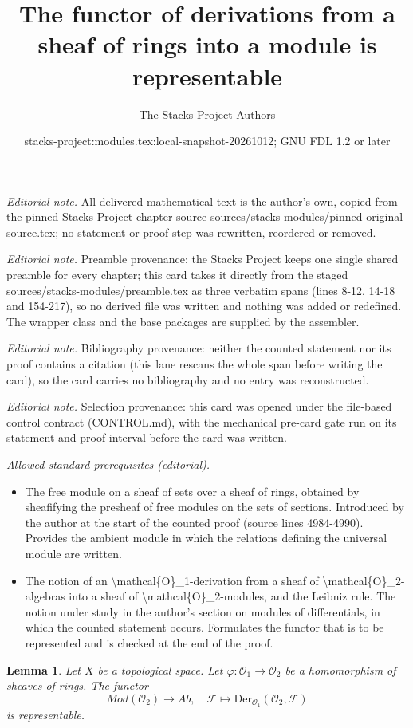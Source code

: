 \documentclass[10pt,a4paper]{amsart}
\title{The functor of derivations from a sheaf of rings into a module is representable}
\author{The Stacks Project Authors}
\date{stacks-project:modules.tex:local-snapshot-20261012; GNU FDL 1.2 or later}
\theoremstyle{plain}
\newtheorem{lemma}[subsection]{Lemma}
\theoremstyle{definition}
\theoremstyle{remark}
\numberwithin{equation}{subsection}
\begin{document}
\maketitle
\noindent\textit{Editorial note.} All delivered mathematical text is the author's own, copied from the pinned Stacks Project chapter source sources/stacks-modules/pinned-original-source.tex; no statement or proof step was rewritten, reordered or removed.\par\medskip
\noindent\textit{Editorial note.} Preamble provenance: the Stacks Project keeps one single shared preamble for every chapter; this card takes it directly from the staged sources/stacks-modules/preamble.tex as three verbatim spans (lines 8-12, 14-18 and 154-217), so no derived file was written and nothing was added or redefined. The wrapper class and the base packages are supplied by the assembler.\par\medskip
\noindent\textit{Editorial note.} Bibliography provenance: neither the counted statement nor its proof contains a citation (this lane rescans the whole span before writing the card), so the card carries no bibliography and no entry was reconstructed.\par\medskip
\noindent\textit{Editorial note.} Selection provenance: this card was opened under the file-based control contract (CONTROL.md), with the mechanical pre-card gate run on its statement and proof interval before the card was written.\par\medskip
\noindent\textit{Allowed standard prerequisites (editorial).}\begin{itemize}
\item The free module on a sheaf of sets over a sheaf of rings, obtained by sheafifying the presheaf of free modules on the sets of sections. Introduced by the author at the start of the counted proof (source lines 4984-4990). Provides the ambient module in which the relations defining the universal module are written.
\item The notion of an \textbackslash{}mathcal\{O\}\_1-derivation from a sheaf of \textbackslash{}mathcal\{O\}\_2-algebras into a sheaf of \textbackslash{}mathcal\{O\}\_2-modules, and the Leibniz rule. The notion under study in the author's section on modules of differentials, in which the counted statement occurs. Formulates the functor that is to be represented and is checked at the end of the proof.
\end{itemize}\medskip
\begin{lemma}
\label{lemma-universal-module}
Let $X$ be a topological space. Let $\varphi : \mathcal{O}_1 \to \mathcal{O}_2$
be a homomorphism of sheaves of rings. The functor
$$
\textit{Mod}(\mathcal{O}_2) \longrightarrow \textit{Ab}, \quad
\mathcal{F} \longmapsto \text{Der}_{\mathcal{O}_1}(\mathcal{O}_2, \mathcal{F})
$$
is representable.
\end{lemma}
\end{document}

